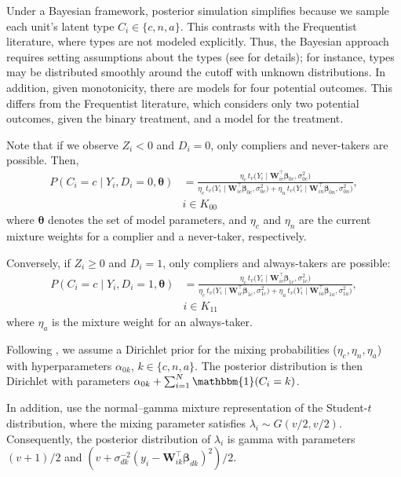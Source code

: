 Under a Bayesian framework, posterior simulation simplifies because we sample each unit’s latent type $C_i \in \{c, n, a\}$. This contrasts with the Frequentist literature, where types are not modeled explicitly. Thus, the Bayesian approach requires setting assumptions about the types (see \cite{chib2016bayesian} for details); for instance, types may be distributed smoothly around the cutoff with unknown distributions. In addition, given monotonicity, there are models for four potential outcomes. This differs from the Frequentist literature, which considers only two potential outcomes, given the binary treatment, and a model for the treatment.

Note that if we observe $Z_i < 0$ and $D_i = 0$, only compliers and never-takers are possible. Then,
\begin{align*}
P(C_i = c \mid Y_i, D_i = 0, \boldsymbol{\theta})
&= \frac{\eta_{c} \, t_v\!\big(Y_i \mid \mathbf{W}_{ic}^{\top} \boldsymbol{\beta}_{0c}, \sigma^2_{0c} \big)}
{\eta_{c} \, t_v\!\big(Y_i \mid \mathbf{W}_{ic}^{\top} \boldsymbol{\beta}_{0c}, \sigma^2_{0c} \big) +
	\eta_{n} \, t_v\!\big(Y_i \mid \mathbf{W}_{in}^{\top} \boldsymbol{\beta}_{0n}, \sigma^2_{0n} \big)},\\
& i \in K_{00}
\end{align*}
where $\boldsymbol{\theta}$ denotes the set of model parameters, and $\eta_{c}$ and $\eta_{n}$ are the current mixture weights for a complier and a never-taker, respectively.

Conversely, if $Z_i \geq 0$ and $D_i = 1$, only compliers and always-takers are possible:
\begin{align*}
P(C_i = c \mid Y_i, D_i = 1, \boldsymbol{\theta})
&= \frac{\eta_{c} \, t_v\!\big(Y_i \mid \mathbf{W}_{ic}^{\top} \boldsymbol{\beta}_{1c}, \sigma^2_{1c} \big)}
{\eta_{c} \, t_v\!\big(Y_i \mid \mathbf{W}_{ic}^{\top} \boldsymbol{\beta}_{1c}, \sigma^2_{1c} \big) +
	\eta_{a} \, t_v\!\big(Y_i \mid \mathbf{W}_{ia}^{\top} \boldsymbol{\beta}_{1a}, \sigma^2_{1a} \big)},\\
& i \in K_{11}
\end{align*}
where $\eta_{a}$ is the mixture weight for an always-taker.

Following \cite{chib2016bayesian}, we assume a Dirichlet prior for the mixing probabilities ($\eta_c, \eta_n,\eta_a$) with hyperparameters $\alpha_{0k}$, $k \in \{c, n, a\}$. The posterior distribution is then Dirichlet with parameters $\alpha_{0k} + \sum_{i=1}^N \mathbbm{1}(C_i = k)$.

In addition, \cite{chib2016bayesian} use the normal--gamma mixture representation of the Student-$t$ distribution, where the mixing parameter satisfies $\lambda_i \sim G(v/2, v/2)$. Consequently, the posterior distribution of $\lambda_i$ is gamma with parameters $(v+1)/2$ and $(v + \sigma_{dk}^{-2}(y_i - \mathbf{W}_{ik}^{\top} \boldsymbol{\beta}_{dk})^2) / 2$.

